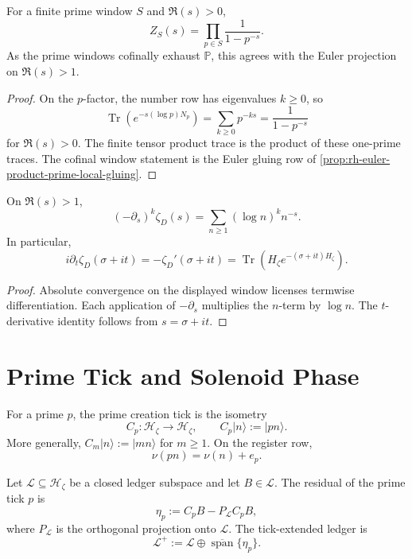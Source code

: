 \begin{theorem}
\label{thm:rh-zeta-finite-window-euler-trace}
For a finite prime window $S$ and $\Re(s)>0$,
$$
Z_S(s)
=
\prod_{p\in S}\frac{1}{1-p^{-s}}.
$$
As the prime windows cofinally exhaust $\mathbb P$, this agrees with the
Euler projection on $\Re(s)>1$.
\end{theorem}

\begin{proof}
On the $p$-factor, the number row has eigenvalues $k\ge0$, so
$$
\operatorname{Tr}(e^{-s(\log p)N_p})
=
\sum_{k\ge0}p^{-ks}
=
\frac{1}{1-p^{-s}}
$$
for $\Re(s)>0$. The finite tensor product trace is the product of these
one-prime traces. The cofinal window statement is the Euler gluing row of
\autoref{prop:rh-euler-product-prime-local-gluing}.
\end{proof}

\begin{corollary}
\label{cor:rh-zeta-energy-moments-trace}
On $\Re(s)>1$,
$$
(-\partial_s)^k\zeta_D(s)
=
\sum_{n\ge1}(\log n)^k n^{-s}.
$$
In particular,
$$
i\partial_t\zeta_D(\sigma+it)
=
-\zeta_D'(\sigma+it)
=
\operatorname{Tr}(H_{\zeta}e^{-(\sigma+it)H_{\zeta}}).
$$
\end{corollary}

\begin{proof}
Absolute convergence on the displayed window licenses termwise
differentiation. Each application of $-\partial_s$ multiplies the
$n$-term by $\log n$. The $t$-derivative identity follows from
$s=\sigma+it$.
\end{proof}

\section{Prime Tick and Solenoid Phase}
\label{sec:rh-zeta-prime-tick-solenoid-phase}

\begin{definition}
\label{def:rh-zeta-prime-creation-tick}
For a prime $p$, the prime creation tick is the isometry
$$
C_p:\mathcal H_{\zeta}\to\mathcal H_{\zeta},
\qquad
C_p|n\rangle:=|pn\rangle.
$$
More generally, $C_m|n\rangle:=|mn\rangle$ for $m\ge1$. On the register
row,
$$
\nu(pn)=\nu(n)+e_p.
$$
\end{definition}

\begin{definition}
\label{def:rh-zeta-tick-ledger-residual}
Let $\mathcal L\subseteq\mathcal H_{\zeta}$ be a closed ledger subspace
and let $B\in\mathcal L$. The residual of the prime tick $p$ is
$$
\eta_p:=C_pB-P_{\mathcal L}C_pB,
$$
where $P_{\mathcal L}$ is the orthogonal projection onto $\mathcal L$.
The tick-extended ledger is
$$
\mathcal L^{+}:=
\mathcal L\oplus\overline{\operatorname{span}}\{\eta_p\}.
$$
\end{definition}


